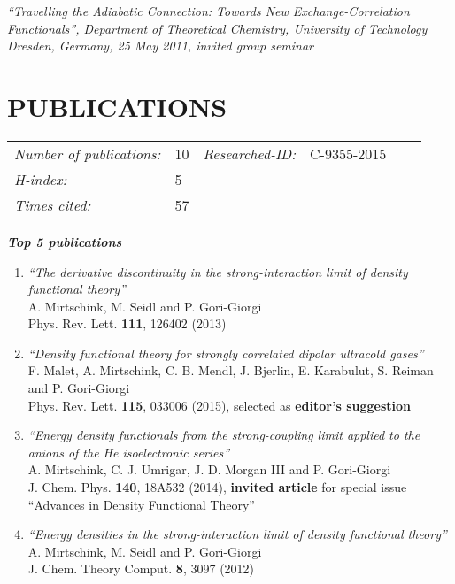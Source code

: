 \documentclass[line,margin]{res}
\begin{document}
\begin{resume}
					\hspace*{.5cm}\parbox[t]{12.5cm}{\sl ``Travelling the Adiabatic Connection: Towards New Exchange-Correlation Functionals'', Department of Theoretical Chemistry, University of Technology Dresden, Germany, 25 May 2011, invited group seminar}
										
\section{PUBLICATIONS} 
					\begin{tabular}{llllll}
						{\sl Number of publications:}	& 10 & \textit{Researched-ID:}	& C-9355-2015\smallskip\\
						{\sl H-index:} 	& 5						\smallskip\\
						{\sl Times cited:} 	& 57
						
					\end{tabular}

				\textit{\textbf{Top 5 publications}}\smallskip

				\begin{enumerate}
				
				\item {\sl ``The derivative discontinuity in the strong-interaction limit of density functional theory''}\\
				A. Mirtschink, M. Seidl and P. Gori-Giorgi\\
				Phys. Rev. Lett. \textbf{111}, 126402 (2013)        

				\item {\sl ``Density functional theory for strongly correlated dipolar ultracold gases''}\\
				F. Malet, A. Mirtschink, C. B. Mendl, J. Bjerlin, E. Karabulut, S. Reiman and P. Gori-Giorgi\\
				Phys. Rev. Lett. \textbf{115}, 033006 (2015), selected as \textbf{editor's suggestion}
				
				\item {\sl ``Energy density functionals from the strong-coupling limit applied to the anions of the He isoelectronic series''}\\
				A. Mirtschink, C. J. Umrigar, J. D. Morgan III and P. Gori-Giorgi\\
				J. Chem. Phys. \textbf{140}, 18A532 (2014), \textbf{invited article} for special issue ``Advances in Density Functional Theory''

				\item {\sl ``Energy densities in the strong-interaction limit of density functional theory''}\\
					A. Mirtschink, M. Seidl and P. Gori-Giorgi\\
					J. Chem. Theory Comput. \textbf{8}, 3097 (2012)
					

\end{enumerate}
\end{resume}
\end{document}
